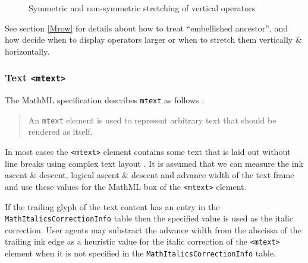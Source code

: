 \begin{figure}
\centering
\caption{Symmetric and non-symmetric stretching of vertical operators}
\label{fig:SymmetricNonSymmetricOperators}
\end{figure}

See section \ref{Mrow} for details about how to treat ``embellished ancestor'',
and how decide when to display operators larger or when to stretch them
vertically \& horizontally.

\subsubsection{Text {\tt <mtext>}}

The MathML specification describes {\tt mtext} as follows \cite{MathML3}:
%
\begin{quote}
  An {\tt mtext} element is used to represent arbitrary text that should be
  rendered as itself.
\end{quote}

In most cases the {\tt <mtext>} element contains some text that is laid out
without line
breaks using complex text layout \cite{CTL}. It is assumed that we can measure
the ink ascent \& descent, logical ascent \& descent and advance width of
the text frame and use these values for the MathML box of the {\tt <mtext>}
element.

If the trailing glyph of the text content has an entry in the
{\tt MathItalicsCorrectionInfo} table then the specified
value is used as the italic correction.
User agents may substract the advance width from the abscissa of the trailing
ink edge as a heuristic value for the italic correction of the {\tt <mtext>}
element when it is not specified in the
{\tt MathItalicsCorrectionInfo} table.


